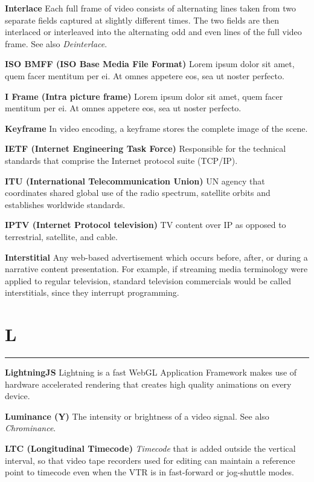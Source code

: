 \medskip
\textbf{Interlace}
Each full frame of video consists of alternating lines taken from two separate fields captured at slightly different times. The two fields are then interlaced or interleaved into the alternating odd and even lines of the full video frame.  See also \textit{Deinterlace}.

\smallskip
\textbf{ISO BMFF (ISO Base Media File Format)}
Lorem ipsum dolor sit amet, quem facer mentitum per ei. At omnes appetere eos, sea ut noster perfecto.

\smallskip
\textbf{I Frame (Intra picture frame)}
Lorem ipsum dolor sit amet, quem facer mentitum per ei. At omnes appetere eos, sea ut noster perfecto.

\smallskip
\textbf{Keyframe}
In video encoding, a keyframe stores the complete image of the scene.

\smallskip
\textbf{IETF (Internet Engineering Task Force)}
Responsible for the technical standards that comprise the Internet protocol suite (TCP/IP).

\smallskip
\textbf{ITU (International Telecommunication Union)}
UN agency that coordinates shared global use of the radio spectrum, satellite orbits and establishes worldwide standards.

\medskip
\textbf{IPTV (Internet Protocol television)}
TV content over IP as opposed to terrestrial, satellite, and cable.

\smallskip
\textbf{Interstitial}
Any web-based advertisement which occurs before, after, or during a narrative content presentation. For example, if streaming media terminology were applied to regular television, standard television commercials would be called interstitials, since they interrupt programming.

\section{L}
\hrule

\medskip
\textbf{LightningJS}
Lightning is a fast WebGL Application Framework makes use of hardware accelerated rendering that creates high quality animations on every device.

\smallskip
\textbf{Luminance (Y)}
The intensity or brightness of a video signal. See also \textit{Chrominance}.

\smallskip
\textbf{LTC (Longitudinal Timecode)}
\textit{Timecode} that is added outside the vertical interval, so that video tape recorders used for editing can maintain a reference point to timecode even when the VTR is in fast-forward or jog-shuttle modes.

